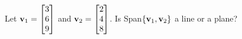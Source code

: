 \documentclass{ximera}
\newcommand{\bv}{{\bf v}}
\begin{document}
  	\begin{question}
  	Let $\bv_1 = \begin{bmatrix} 3\\6\\ 9\end{bmatrix}$  and $\bv_2 = \begin{bmatrix} 2\\4\\8\end{bmatrix}$. Is Span$\{\bv_1, \bv_2\}$ a line or a plane?
  		
  		
  		\begin{multipleChoice}
  		\end{multipleChoice}
  		
  	\end{question}
  	
  
  
\end{document}
